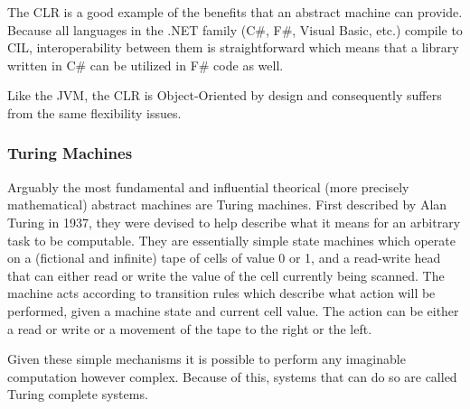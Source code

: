 The CLR is a good example of the benefits that an abstract machine can
provide. Because all languages in the .NET family (C\#, F\#, Visual Basic, etc.)
compile to CIL, interoperability between them is straightforward which means
that a library written in C\# can be utilized in F\# code as well.

Like the JVM, the CLR is Object-Oriented by design and consequently suffers from
the same flexibility issues.

\subsubsection{Turing Machines}

Arguably the most fundamental and influential theorical (more precisely
mathematical) abstract machines are Turing machines. First described by Alan
Turing in 1937\cite{sep-turing-machine}, they were devised to help describe what
it means for an arbitrary task to be computable. They are essentially simple
state machines which operate on a (fictional and infinite) tape of cells of
value 0 or 1, and a read-write head that can either read or write the value of
the cell currently being scanned\cite{sep-turing-machine}. The machine acts
according to transition rules which describe what action will be performed,
given a machine state and current cell value. The action can be either a read or
write or a movement of the tape to the right or the left.

Given these simple mechanisms it is possible to perform any imaginable
computation however complex. Because of this, systems that can do so are called
Turing complete systems.


